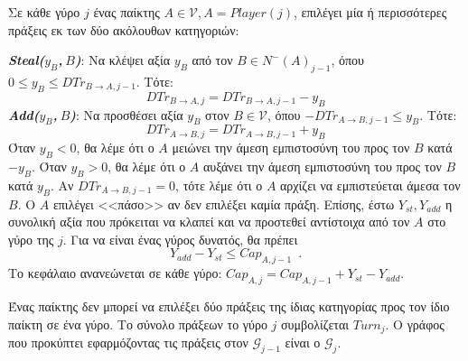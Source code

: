 \begin{definition}[Γύροι]
  Σε κάθε γύρο $j$ ένας παίκτης $A \in \mathcal{V}, A = Player\left(j\right)$, επιλέγει μία ή περισσότερες πράξεις εκ των δύο
  ακόλουθων κατηγοριών:

  \noindent \textit{\textbf{Steal($y_B$,$\:B$)}}: Να κλέψει αξία $y_B$ από τον $B \in N^{-}\left(A\right)_{j-1}$, όπου
  $0 \leq y_B \leq DTr_{B \rightarrow A, j-1}$. Τότε:
  \begin{equation*}
     DTr_{B \rightarrow A, j} = DTr_{B \rightarrow A, j-1} - y_B
  \end{equation*}
  \noindent \textit{\textbf{Add($y_B$,$\:B$)}}: Να προσθέσει αξία $y_B$ στον $B \in \mathcal{V}$, όπου
  $-DTr_{A \rightarrow B, j-1} \leq y_B$. Τότε:
  \begin{equation*}
     DTr_{A \rightarrow B, j} = DTr_{A \rightarrow B, j-1} + y_B
  \end{equation*}
  Όταν $y_B < 0$, θα λέμε ότι ο $A$ μειώνει την άμεση εμπιστοσύνη του προς τον $B$ κατά $-y_B$. Όταν $y_B > 0$, θα λέμε ότι ο
  $A$ αυξάνει την άμεση εμπιστοσύνη του προς τον $B$ κατά $y_B$. Αν $DTr_{A \rightarrow B, j-1} = 0$, τότε λέμε ότι ο $A$
  αρχίζει να εμπιστεύεται άμεσα τον $B$. Ο $A$ επιλέγει <<πάσο>> αν δεν επιλέξει καμία πράξη. Επίσης, έστω $Y_{st}, Y_{add}$ η
  συνολική αξία που πρόκειται να κλαπεί και να προστεθεί αντίστοιχα από τον $A$ στο γύρο της $j$. Για να είναι ένας γύρος
  δυνατός, θα πρέπει
  \begin{equation}
     Y_{add} - Y_{st} \leq Cap_{A, j-1} \enspace.
  \end{equation}
  Το κεφάλαιο ανανεώνεται σε κάθε γύρο: $Cap_{A, j} = Cap_{A, j-1} + Y_{st} - Y_{add}$.

  Ένας παίκτης δεν μπορεί να επιλέξει δύο πράξεις της ίδιας κατηγορίας προς τον ίδιο παίκτη σε ένα γύρο. Το σύνολο πράξεων
  το γύρο $j$ συμβολίζεται $Turn_j$. Ο γράφος που προκύπτει εφαρμόζοντας τις πράξεις στον $\mathcal{G}_{j-1}$ είναι ο
  $\mathcal{G}_j$.
\end{definition}
